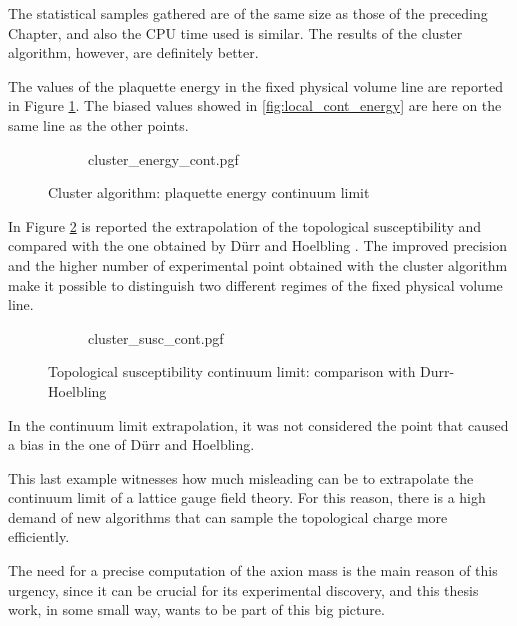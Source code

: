 The statistical samples gathered are of the same size as those of the preceding Chapter,
and also the CPU time used is similar.
The results of the cluster algorithm, however, are definitely better.

The values of the plaquette energy in the fixed physical volume line are reported in Figure \ref{fig:cluster_energy_cont}.
The biased values showed in \ref{fig:local_cont_energy} are here on the same line as the other points.

\begin{figure}[!htb]
    \centering
    \begin{subfigure}{\textwidth}
        \centering
        {cluster_energy_cont.pgf}
    \end{subfigure}\vspace{2em}
    \begin{subfigure}{\textwidth}
        \centering
        
    \end{subfigure}
    \caption{Cluster algorithm: plaquette energy continuum limit}
    \label{fig:cluster_energy_cont}
\end{figure}

In Figure \ref{fig:cluster_susc_cont} is reported the extrapolation of the topological susceptibility
and compared with the one obtained by D\"urr and Hoelbling \cite{durr-hoelbling:2005}.
The improved precision and the higher number of experimental point obtained with the cluster algorithm
make it possible to distinguish two different regimes of the fixed physical volume line.

\begin{figure}[!htb]
    \centering
    \begin{subfigure}{\textwidth}
        \centering
        {cluster_susc_cont.pgf}
    \end{subfigure}\vspace{2em}
    \begin{subfigure}{\textwidth}
        \centering
        
    \end{subfigure}
    \caption{Topological susceptibility continuum limit: comparison with Durr-Hoelbling}
    \label{fig:cluster_susc_cont}
\end{figure}

In the continuum limit extrapolation,
it was not considered the point that caused a bias in the one of D\"urr and Hoelbling.

This last example witnesses how much misleading can be to extrapolate the continuum limit of a lattice gauge field theory.
For this reason, there is a high demand of new algorithms that can sample the topological charge more efficiently.

The need for a precise computation of the axion mass is the main reason of this urgency,
since it can be crucial for its experimental discovery, and this thesis work,
in some small way, wants to be part of this big picture.

